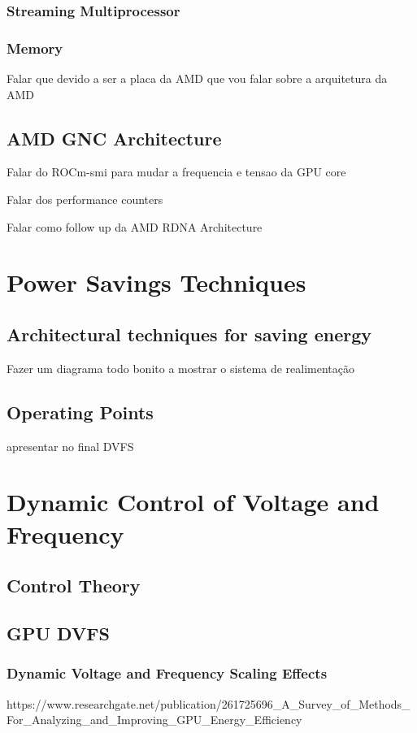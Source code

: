 \subsubsection{Streaming Multiprocessor}
\subsubsection{Memory }

Falar que devido a ser a placa da AMD que vou falar sobre a arquitetura da AMD

\subsection{AMD GNC Architecture}

Falar do ROCm-smi para mudar a frequencia e tensao da GPU core

Falar dos performance counters

Falar como follow up da AMD RDNA Architecture
\section{Power Savings Techniques}
\label{section:overview}

\subsection{Architectural techniques for saving energy}
Fazer um diagrama todo bonito a mostrar o sistema de realimentação
\subsection{Operating Points}
\label{section:dvfs}
apresentar no final DVFS 

\section{Dynamic Control of Voltage and Frequency}
\subsection{Control Theory}
\subsection{GPU DVFS}
\subsubsection{Dynamic Voltage and Frequency Scaling Effects}
\label{section:solarch}
https://www.researchgate.net/publication/261725696_A_Survey_of_Methods_For_Analyzing_and_Improving_GPU_Energy_Efficiency
